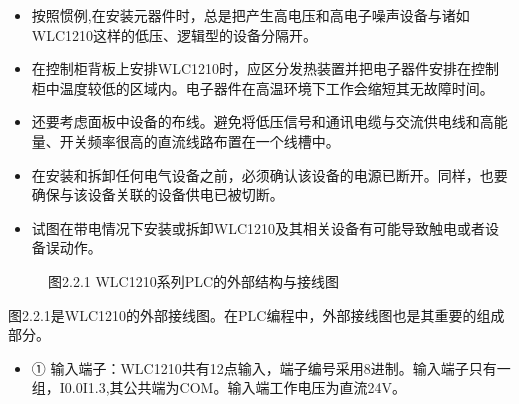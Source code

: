 \documentclass[a4paper,10pt,english]{sphinxmanual}
\begin{document}
\sphinxAtStartPar
{}
\begin{itemize}
\item {} 
\sphinxAtStartPar
按照惯例,在安装元器件时，总是把产生高电压和高电子噪声设备与诸如WLC\sphinxhyphen{}1210这样的低压、逻辑型的设备分隔开。

\item {} 
\sphinxAtStartPar
在控制柜背板上安排WLC\sphinxhyphen{}1210时，应区分发热装置并把电子器件安排在控制柜中温度较低的区域内。电子器件在高温环境下工作会缩短其无故障时间。

\item {} 
\sphinxAtStartPar
还要考虑面板中设备的布线。避免将低压信号和通讯电缆与交流供电线和高能量、开关频率很高的直流线路布置在一个线槽中。

\end{itemize}

\sphinxAtStartPar
{}
\begin{itemize}
\item {} 
\sphinxAtStartPar
在安装和拆卸任何电气设备之前，必须确认该设备的电源已断开。同样，也要确保与该设备关联的设备供电已被切断。

\item {} 
\sphinxAtStartPar
试图在带电情况下安装或拆卸WLC\sphinxhyphen{}1210及其相关设备有可能导致触电或者设备误动作。

\end{itemize}

\sphinxAtStartPar
{}

\begin{figure}[htbp]
\centering
\capstart

\noindent{}
\caption{图2.2.1  WLC\sphinxhyphen{}1210系列PLC的外部结构与接线图}\label{\detokenize{Product_Overview:id12}}\end{figure}

\sphinxAtStartPar
图2.2.1是WLC\sphinxhyphen{}1210的外部接线图。在PLC编程中，外部接线图也是其重要的组成部分。
\begin{itemize}
\item {} 
\sphinxAtStartPar
① 输入端子：WLC\sphinxhyphen{}1210共有12点输入，端子编号采用8进制。输入端子只有一组，I0.0\sphinxhyphen{}I1.3,其公共端为COM。输入端工作电压为直流24V。

\end{itemize}
\end{document}
